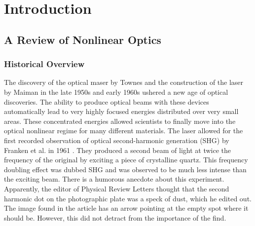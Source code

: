 \chapter{Introduction}\label{chap:intro}
\partialtoc



\section{A Review of Nonlinear Optics}



\subsection{Historical Overview}\label{chap_theory_hist}

The discovery of the optical maser by Townes \cite{PhysRev.112.1940} and the
construction of the laser by Maiman in the late 1950s and early 1960s ushered a
new age of optical discoveries. The ability to produce optical beams with these
devices automatically lead to very highly focused energies distributed over very
small areas. These concentrated energies allowed scientists to finally move into
the optical nonlinear regime for many different materials. The laser allowed for
the first recorded observation of optical second-harmonic generation (SHG) by
Franken et al. in 1961 \cite{PhysRevLett.7.118}. They produced a second beam of
light at twice the frequency of the original by exciting a piece of crystalline
quartz. This frequency doubling effect was dubbed SHG and was observed to be
much less intense than the exciting beam. There is a humorous anecdote about
this experiment. Apparently, the editor of Physical Review Letters thought that
the second harmonic dot on the photographic plate was a speck of dust, which he
edited out. The image found in the article has an arrow pointing at the empty
spot where it should be. However, this did not detract from the importance of
the find.


